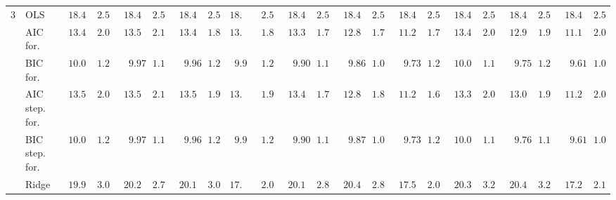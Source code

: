 \begin{tabular}{llllllllllllllllllllll}
	3 & OLS  & $\phantom{0}18.463$ & $\phantom{0}2.550$ & $\phantom{0}18.463$ & $\phantom{0}2.550$ & $\phantom{0}18.463$ & $\phantom{0}2.550$ & $18.463$ & $\phantom{0}2.550$ & $\phantom{0}18.463$ & $\phantom{0}2.550$ & $\phantom{0}18.463$ & $\phantom{0}2.550$ & $\phantom{0}18.463$ & $\phantom{0}2.550$ & $\phantom{0}18.463$ & $\phantom{0}2.550$ & $\phantom{0}18.463$ & $\phantom{0}2.550$ & $\phantom{0}18.463$ & $\phantom{0}2.550$ \\
	& AIC for.  & $\phantom{0}13.483$ & $\phantom{0}2.065$ & $\phantom{0}13.504$ & $\phantom{0}2.158$ & $\phantom{0}13.468$ & $\phantom{0}1.849$ & $13.341$ & $\phantom{0}1.893$ & $\phantom{0}13.367$ & $\phantom{0}1.722$ & $\phantom{0}12.806$ & $\phantom{0}1.788$ & $\phantom{0}11.298$ & $\phantom{0}1.736$ & $\phantom{0}13.415$ & $\phantom{0}2.079$ & $\phantom{0}12.983$ & $\phantom{0}1.949$ & $\phantom{0}11.195$ & $\phantom{0}2.024$ \\
	& BIC for.  & $\phantom{0}10.012$ & $\phantom{0}1.223$ & $\phantom{00}9.976$ & $\phantom{0}1.186$ & $\phantom{00}9.963$ & $\phantom{0}1.265$ & $\phantom{0}9.920$ & $\phantom{0}1.229$ & $\phantom{00}9.905$ & $\phantom{0}1.133$ & $\phantom{00}9.864$ & $\phantom{0}1.057$ & $\phantom{00}9.734$ & $\phantom{0}1.265$ & $\phantom{0}10.012$ & $\phantom{0}1.121$ & $\phantom{00}9.754$ & $\phantom{0}1.200$ & $\phantom{00}9.618$ & $\phantom{0}1.094$ \\
	& AIC step. for.  & $\phantom{0}13.565$ & $\phantom{0}2.043$ & $\phantom{0}13.553$ & $\phantom{0}2.192$ & $\phantom{0}13.517$ & $\phantom{0}1.974$ & $13.340$ & $\phantom{0}1.942$ & $\phantom{0}13.435$ & $\phantom{0}1.714$ & $\phantom{0}12.816$ & $\phantom{0}1.827$ & $\phantom{0}11.256$ & $\phantom{0}1.663$ & $\phantom{0}13.386$ & $\phantom{0}2.032$ & $\phantom{0}13.071$ & $\phantom{0}1.993$ & $\phantom{0}11.258$ & $\phantom{0}2.081$ \\
	& BIC step. for.  & $\phantom{0}10.001$ & $\phantom{0}1.208$ & $\phantom{00}9.974$ & $\phantom{0}1.185$ & $\phantom{00}9.961$ & $\phantom{0}1.263$ & $\phantom{0}9.923$ & $\phantom{0}1.230$ & $\phantom{00}9.908$ & $\phantom{0}1.133$ & $\phantom{00}9.870$ & $\phantom{0}1.061$ & $\phantom{00}9.734$ & $\phantom{0}1.265$ & $\phantom{0}10.003$ & $\phantom{0}1.120$ & $\phantom{00}9.761$ & $\phantom{0}1.197$ & $\phantom{00}9.618$ & $\phantom{0}1.094$ \\
	& Ridge  & $\phantom{0}19.996$ & $\phantom{0}3.032$ & $\phantom{0}20.239$ & $\phantom{0}2.755$ & $\phantom{0}20.181$ & $\phantom{0}3.098$ & $17.018$ & $\phantom{0}2.088$ & $\phantom{0}20.189$ & $\phantom{0}2.879$ & $\phantom{0}20.482$ & $\phantom{0}2.868$ & $\phantom{0}17.530$ & $\phantom{0}2.075$ & $\phantom{0}20.396$ & $\phantom{0}3.201$ & $\phantom{0}20.412$ & $\phantom{0}3.284$ & $\phantom{0}17.258$ & $\phantom{0}2.124$ \\

\end{tabular}
